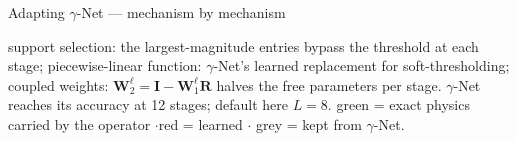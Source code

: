 \begin{frame}{Adapting $\gamma$-Net --- mechanism by mechanism}
  \\[5pt]
  {\tiny\color{soft} support selection: the largest-magnitude entries bypass the
   threshold at each stage; piecewise-linear function: $\gamma$-Net's learned
   replacement for soft-thresholding; coupled weights:
   $\mathbf{W}_{2}^{\ell} = \mathbf{I} - \mathbf{W}_{1}^{\ell}\mathbf{R}$ halves the
   free parameters per stage. $\gamma$-Net reaches its accuracy at 12 stages; default
   here $L = 8$. \textcolor{good}{green} = exact physics carried by the operator
   \quad$\cdot$\quad \textcolor{accent}{red} = learned \quad$\cdot$\quad
   \textcolor{soft}{grey} = kept from $\gamma$-Net.\par}
\end{frame}

